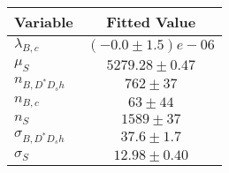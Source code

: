 \begin{tabular}[t]{lc}
\hline
Variable &Fitted Value\\
\hline\hline
$\lambda_{B,c}$&$(-0.0\pm1.5)e-06$\\
\hline
$\mu_S$&$5279.28\pm0.47$\\
\hline
$n_{B, D^* D_s h}$&$762\pm37$\\
\hline
$n_{B,c}$&$63\pm44$\\
\hline
$n_S$&$1589\pm37$\\
\hline
$\sigma_{B, D^* D_s h}$&$37.6\pm1.7$\\
\hline
$\sigma_S$&$12.98\pm0.40$\\
\hline
\end{tabular}